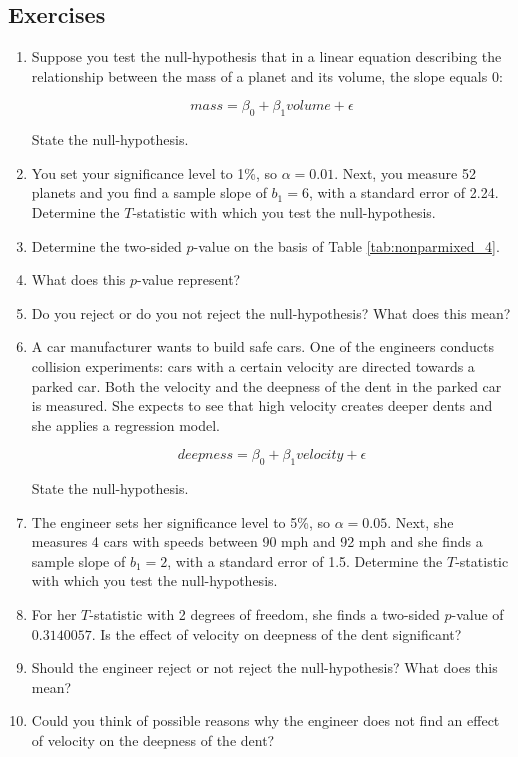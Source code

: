 \documentclass[]{report}\usepackage[]{graphicx}\usepackage[]{color}
\begin{document}
\subsection{Exercises}

\begin{enumerate}

\item Suppose you test the null-hypothesis that in a linear equation describing the relationship between the mass of a planet and its volume, the slope equals 0:

\begin{equation}
mass = \beta_0 + \beta_1 volume + \epsilon
\end{equation}

State the null-hypothesis.


\item You set your significance level to 1\%, so $\alpha=0.01$. Next, you measure 52 planets and you find a sample slope of $b_1=6$, with a standard error of 2.24. Determine the $T$-statistic with which you test the null-hypothesis.

\item Determine the two-sided $p$-value on the basis of Table \ref{tab:nonparmixed_4}.

\item What does this $p$-value represent? 

\item Do you reject or do you not reject the null-hypothesis? What does this mean?

\item A car manufacturer wants to build safe cars. One of the engineers conducts collision experiments: cars with a certain velocity are directed towards a parked car. Both the velocity and the deepness of the dent in the parked car is measured. She expects to see that high velocity creates deeper dents and she applies a regression model.

\begin{equation}
deepness = \beta_0 + \beta_1 velocity + \epsilon
\end{equation}

State the null-hypothesis.

\item The engineer sets her significance level to 5\%, so $\alpha=0.05$. Next, she measures 4 cars with speeds between 90 mph and 92 mph and she finds a sample slope of $b_1=2$, with a standard error of 1.5. Determine the $T$-statistic with which you test the null-hypothesis.

\item For her $T$-statistic with 2 degrees of freedom, she finds a two-sided $p$-value of $0.3140057$. Is the effect of velocity on deepness of the dent significant?

\item Should the engineer reject or not reject the null-hypothesis? What does this mean?

\item Could you think of possible reasons why the engineer does not find an effect of velocity on the deepness of the dent?

\end{enumerate}
\end{document}

